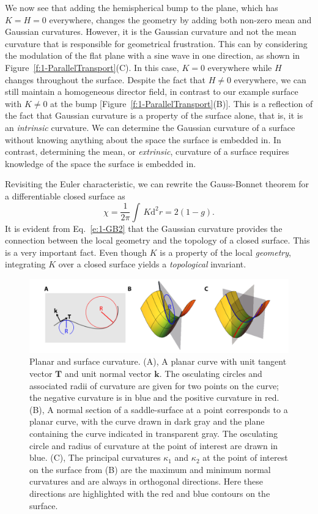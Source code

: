 We now see that adding the hemispherical bump to the plane, which has $K = H = 0$ everywhere, changes the geometry by adding both non-zero mean and Gaussian curvatures.
However, it is the Gaussian curvature and not the mean curvature that is responsible for geometrical frustration.
This can by considering the modulation of the flat plane with a sine wave in one direction, as shown in Figure~\ref{f:1-ParallelTransport}(C).
In this case, $K=0$ everywhere while $H$ changes throughout the surface.
Despite the fact that $H \neq 0$ everywhere, we can still maintain a homogeneous director field, in contrast to our example surface with $K \neq 0$ at the bump [Figure~\ref{f:1-ParallelTransport}(B)].
This is a reflection of the fact that Gaussian curvature is a property of the surface alone, that is, it is an \textit{intrinsic} curvature.
We can determine the Gaussian curvature of a surface without knowing anything about the space the surface is embedded in.
In contrast, determining the mean, or \textit{extrinsic}, curvature of a surface requires knowledge of the space the surface is embedded in.

Revisiting the Euler characteristic, we can rewrite the Gauss-Bonnet theorem for a differentiable closed surface as
\begin{equation}
  \chi = \frac{1}{2 \pi} \int \, K \textrm{d}^2r = 2(1-g)\label{e:1-GB2}.
\end{equation}
It is evident from Eq.~\ref{e:1-GB2} that the Gaussian curvature provides the connection between the local geometry and the topology of a closed surface.
This is a very important fact.
Even though $K$ is a property of the local \textit{geometry}, integrating $K$ over a closed surface yields a \textit{topological} invariant.
\begin{figure}
  \centering
  \includegraphics{figures/C1/Ch1-Figs_Curvature.png}
  \caption{Planar and surface curvature.
  (A), A planar curve with unit tangent vector $\mathbf{T}$ and unit normal vector $\mathbf{k}$. The osculating circles and associated radii of curvature are given for two points on the curve; the negative curvature is in blue and the positive curvature in red.
  (B), A normal section of a saddle-surface at a point corresponds to a planar curve, with the curve drawn in dark gray and the plane containing the curve indicated in transparent gray.
  The osculating circle and radius of curvature at the point of interest are drawn in blue.
  (C), The principal curvatures $\kappa_1$ and $\kappa_2$ at the point of interest on the surface from (B) are the maximum and minimum normal curvatures and are always in orthogonal directions. Here these directions are highlighted with the red and blue contours on the surface.}\label{f:1-Curvature}
\end{figure}

